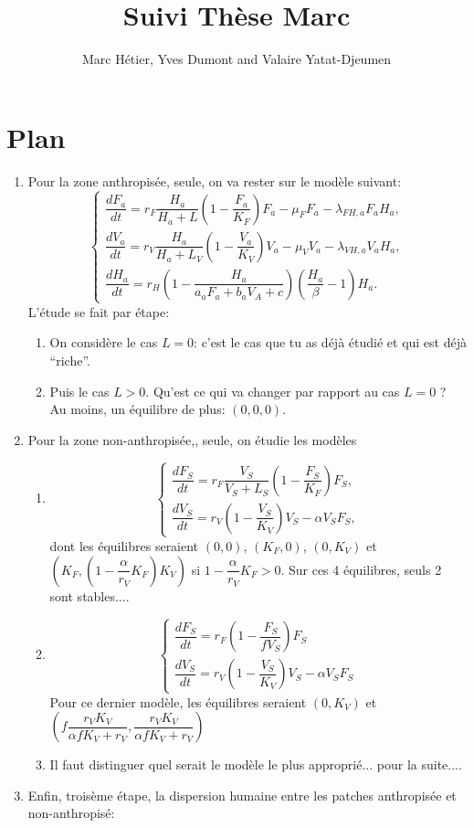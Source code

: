 \documentclass{article}
\title{Suivi Thèse Marc}
\author{Marc Hétier, Yves Dumont  and Valaire Yatat-Djeumen}
\begin{document}
\maketitle
\section{Plan}
\begin{enumerate}
\item Pour la zone anthropisée, seule, on va rester sur le modèle suivant:
\[
\left\{ \begin{array}{l}
\dfrac{dF_{a}}{dt}=r_{F}\dfrac{H_{a}}{H_{a}+L}\left(1-\dfrac{F_{a}}{K_{F}}\right)F_{a}-\mu_{F}F_{a}-\lambda_{FH,a}F_{a}H_{a},\\
\dfrac{dV_{a}}{dt}=r_{V}\dfrac{H_{a}}{H_{a}+L_{V}}\left(1-\dfrac{V_{a}}{K_{V}}\right)V_{a}-\mu_{V}V_{a}-\lambda_{VH,a}V_{a}H_{a},\\
\dfrac{dH_{a}}{dt}=r_{H}\left(1-\dfrac{H_{a}}{a_{a}F_{a}+b_{a}V_{A}+c}\right)\left(\dfrac{H_{a}}{\beta}-1\right)H_{a}.
\end{array}\right.
\]
L'étude se fait par étape:
\begin{enumerate}
\item On considère le cas $L=0$: c'est le cas que tu as déjà étudié et qui est déjà ``riche''.
\item Puis le cas $L>0$. Qu'est ce qui va changer par rapport au cas $L=0$
? Au moins, un équilibre de plus: $(0,0,0)$.
\end{enumerate}
\item Pour la zone non-anthropisée,, seule, on étudie les modèles
\begin{enumerate}
\item 
\[
\left\{ \begin{array}{l}
\dfrac{dF_{S}}{dt}=r_{F}\dfrac{V_{S}}{V_{S}+L_{S}}\left(1-\dfrac{F_{S}}{K_{F}}\right)F_{S},\\
\dfrac{dV_{S}}{dt}=r_{V}\left(1-\dfrac{V_{S}}{K_{V}}\right)V_{S}-\alpha V_{S}F_{S},
\end{array}\right.
\]
dont les équilibres seraient $(0,0)$, $(K_{F},0)$, $(0,K_{V})$
et $\left(K_{F},\left(1-\dfrac{\alpha}{r_{V}}K_{F}\right)K_{V}\right)$
si $1-\dfrac{\alpha}{r_{V}}K_{F}>0$. Sur ces 4 équilibres, seuls
2 sont stables....
\item 
\[
\left\{ \begin{array}{l}
\dfrac{dF_{S}}{dt}=r_{F}\left(1-\dfrac{F_{S}}{fV_{S}}\right)F_{S}\\
\dfrac{dV_{S}}{dt}=r_{V}\left(1-\dfrac{V_{S}}{K_{V}}\right)V_{S}-\alpha V_{S}F_{S}
\end{array}\right.
\]
Pour ce dernier modèle, les équilibres seraient $(0,K_{V})$ et $\left(f\dfrac{r_{V}K_{V}}{\alpha fK_{V}+r_{V}},\dfrac{r_{V}K_{V}}{\alpha fK_{V}+r_{V}}\right)$
\item Il faut distinguer quel serait le modèle le plus approprié... pour
la suite....
\end{enumerate}
\item Enfin, troisème étape, la dispersion humaine entre les patches anthropisée
et non-anthropisé:
\end{enumerate}
\end{document}
